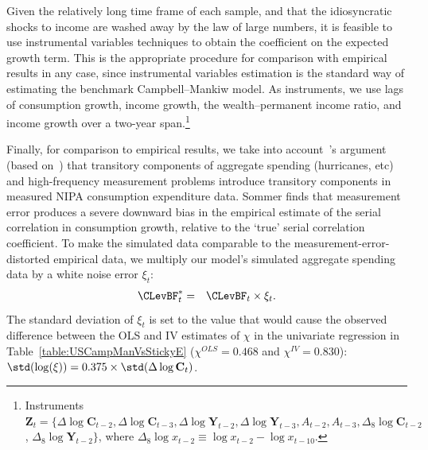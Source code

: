 Given the relatively long time frame of each sample, and that the idiosyncratic shocks to income are washed away by the law of large numbers, it is feasible to use instrumental variables techniques to obtain the coefficient on the expected growth term.  This is the appropriate procedure for comparison with empirical results in any case, since instrumental variables estimation is the standard way of estimating the benchmark Campbell--Mankiw model.  As instruments, we use lags of consumption growth, income growth, the wealth--permanent income ratio, and income growth over a two-year span.\footnote{Instruments $\textbf{Z}_t = \{\Delta \log \mathbf{C}_{t-2}, \Delta \log \mathbf{C}_{t-3}, \Delta \log \mathbf{Y}_{t-2}, \Delta \log \mathbf{Y}_{t-3}, A_{t-2}, A_{t-3}, \Delta_8 \log \mathbf{C}_{t-2}$, $\Delta_8 \log \mathbf{Y}_{t-2} \}$, where $\Delta_8 \log x_{t-2}\equiv \log x_{t-2}-\log x_{t-10}$.}

Finally, for comparison to empirical results, we take into account~\cite{som07}'s argument (based on~\cite{wilcox:aer}) that transitory components of aggregate spending %
(hurricanes, etc) and high-frequency measurement problems introduce transitory components in measured NIPA consumption expenditure data.  Sommer finds that measurement error produces a severe downward bias in the empirical estimate of the serial correlation in consumption growth, relative to the `true' serial correlation coefficient.  To make the simulated data comparable to the measurement-error-distorted empirical data, we multiply our model's simulated aggregate spending data by a white noise error $\xi_t$:
\begin{eqnarray*}
  {\CLevBF}^*_{t} & = & \CLevBF_{t}\times\xi_{t}.
\end{eqnarray*}
The standard deviation of $\xi_t$ is set to the value that would cause the observed difference between the OLS and IV estimates of $\chi$ in the univariate regression in Table~\ref{table:USCampManVsStickyE} ($\chi^{OLS}=0.468$ and $\chi^{IV}=0.830$): $\std(\log(\xi))= 0.375\times\std(\Delta \log \mathbf{C}_t)$.

